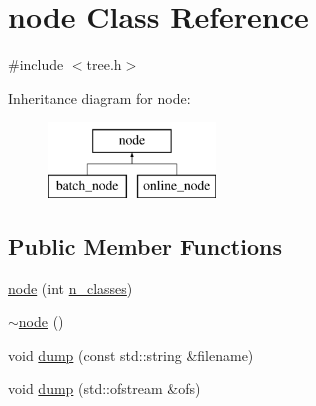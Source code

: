 \hypertarget{classnode}{\section{node Class Reference}
\label{classnode}
}


{\ttfamily \#include $<$tree.\+h$>$}

Inheritance diagram for node\+:\begin{figure}[H]
\begin{center}
\leavevmode
\includegraphics[height=2.000000cm]{classnode}
\end{center}
\end{figure}
\subsection*{Public Member Functions}
\begin{DoxyCompactItemize}
\item 
\hyperlink{classnode_a7e5f4a2e917fe20d91d75faf2e9ba5de}{node} (int \hyperlink{classnode_a8c4864582cb3fe15e84e7908d0965150}{n\+\_\+classes})
\item 
\hyperlink{classnode_a482f83436a89f09d289b26144d817adf}{$\sim$node} ()
\item 
void \hyperlink{classnode_a873438b420d0f6d2659a1b25875ed300}{dump} (const std\+::string \&filename)
\item 
void \hyperlink{classnode_acab00fde3bcc5d44044c39a37313b4eb}{dump} (std\+::ofstream \&ofs)
\end{DoxyCompactItemize}
